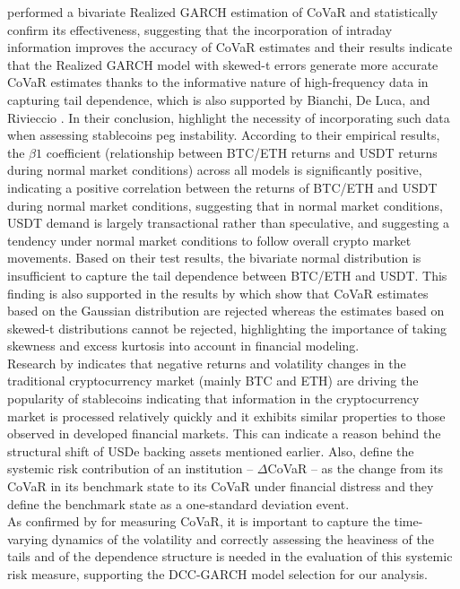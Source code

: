 \documentclass[12pt,a4paper,titlepage,oneside,english]{article}
\begin{document}
\parencite{Chen03032026} performed a bivariate Realized GARCH estimation of CoVaR and statistically confirm its effectiveness, suggesting that the incorporation of intraday information improves the accuracy of CoVaR estimates and their results indicate that the Realized GARCH model with skewed-t errors generate more accurate CoVaR estimates thanks to the informative nature of high-frequency data in capturing tail dependence, which is also supported by Bianchi, De Luca, and Rivieccio \parencite{BIANCHI2023391}. In their conclusion, \parencite{Chen03032026} highlight the necessity of incorporating such data when assessing stablecoins peg instability. According to their empirical results, the $\beta1$ coefficient (relationship between BTC/ETH returns and USDT returns during normal market conditions) across all models is significantly positive, indicating a positive correlation between the returns of BTC/ETH and USDT during normal market conditions, suggesting that in normal market conditions, USDT demand is largely transactional rather than speculative, and suggesting a tendency  under normal market conditions to follow overall crypto market movements. 
Based on their test results, the bivariate normal distribution is insufficient to capture the tail dependence between BTC/ETH and USDT. This finding is also supported in the results by \parencite{GIRARDI20133169} which show that CoVaR estimates based on the Gaussian distribution are rejected whereas the estimates based on skewed-t distributions cannot be rejected, highlighting the importance of taking skewness and excess kurtosis into account in financial modeling. \\
Research by \parencite{LET2023122318} indicates that negative returns and volatility changes in the traditional cryptocurrency market (mainly BTC and ETH) are driving the popularity of stablecoins indicating that information in the cryptocurrency market is processed relatively quickly and it exhibits similar properties to those observed in developed financial markets. This can indicate a reason behind the structural shift of USDe backing assets mentioned earlier.
Also, \parencite{GIRARDI20133169} define the systemic risk contribution of an institution – $\Delta$CoVaR – as the change from its CoVaR in its benchmark state to its CoVaR under financial distress and they define the benchmark state as a one-standard deviation event.\\
 As confirmed by \parencite{BIANCHI2023391} for measuring CoVaR, it is important to capture the time-varying dynamics of the volatility and correctly assessing the heaviness of the tails and of the dependence structure is needed in the evaluation of this systemic risk measure, supporting the DCC-GARCH model selection for our analysis.
\end{document}

